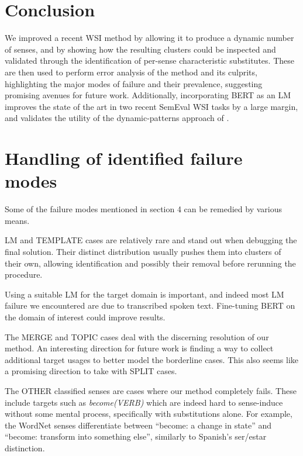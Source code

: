 \documentclass[11pt,a4paper]{article}
\begin{document}
\section{Conclusion}
\vspace{-0.4em}
We improved a recent WSI method by allowing it to produce a dynamic number of senses, and by showing how the resulting clusters could be inspected and validated through the identification of per-sense characteristic substitutes. These are then used to perform error analysis of the method and its culprits, highlighting the major modes of failure and their prevalence, suggesting promising avenues for future work.
Additionally, incorporating BERT as an LM improves the state of the art in two recent SemEval WSI tasks by a large margin, and    validates the utility of the dynamic-patterns approach of \citet{amrami2018word}.
 











\appendix



    \newpage
     \section{Handling of identified failure modes} 
Some of the failure modes mentioned in section 4 can be remedied by various means.

LM and TEMPLATE cases are relatively rare and stand out when debugging the final solution. Their distinct distribution usually pushes them into clusters of their own, allowing identification and possibly their removal before rerunning the procedure.


Using a suitable LM for the target domain is important, and indeed most LM
failure we encountered are due to transcribed spoken text. Fine-tuning BERT on the
domain of interest could improve results.

The MERGE and TOPIC cases deal with the discerning resolution of our method. 
An interesting direction for future work is finding a way to collect additional target usages to better model the borderline cases. This also seems like a promising direction to take with SPLIT cases. %

The OTHER classified senses are cases where our method completely fails. These
include targets such as \emph{become(VERB)} which are
indeed hard to sense-induce without some mental process, specifically with substitutions alone. For example, the WordNet senses differentiate between ``become: a change in state'' and ``become: transform into something else'', similarly to Spanish's ser/estar distinction. 
\end{document}
